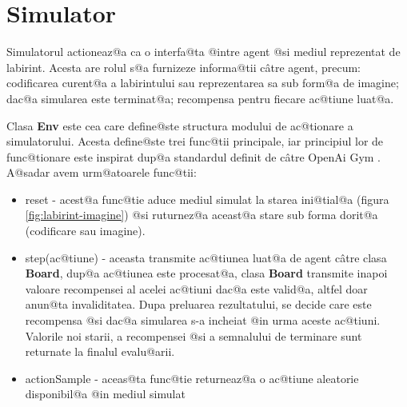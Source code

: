 \section{Simulator}

Simulatorul actioneaz@a ca o interfa@ta @intre agent @si mediul reprezentat de labirint. Acesta are rolul s@a furnizeze informa@tii c\^ atre agent, precum: codificarea curent@a a labirintului sau reprezentarea sa sub form@a de imagine; dac@a simularea este terminat@a; recompensa pentru fiecare ac@tiune luat@a.

Clasa \textbf{Env} este cea care define@ste structura modului de ac@tionare a simulatorului. Acesta define@ste trei func@tii principale, iar principiul lor de func@tionare este inspirat dup@a standardul definit de c\^ atre OpenAi Gym \cite{open-ai-gym-env-format}. A@sadar avem urm@atoarele func@tii:

\begin{itemize}
	\item reset - acest@a func@tie aduce mediul simulat la starea ini@tial@a (figura \ref{fig:labirint-imagine}) @si ruturnez@a aceast@a stare sub forma dorit@a (codificare sau imagine).
	\item step(ac@tiune) - aceasta transmite ac@tiunea luat@a de agent c\^ atre clasa \textbf{Board}, dup@a ac@tiunea este procesat@a, clasa \textbf{Board} transmite inapoi valoare recompensei al acelei ac@tiuni dac@a este valid@a, altfel doar anun@ta invaliditatea. Dupa preluarea rezultatului, se decide care este recompensa @si dac@a simularea s-a incheiat @in urma aceste ac@tiuni. Valorile noi starii, a recompensei @si a semnalului de terminare sunt returnate la finalul evalu@arii.
	\item actionSample - aceas@ta func@tie returneaz@a o ac@tiune aleatorie disponibil@a @in mediul simulat
\end{itemize}



